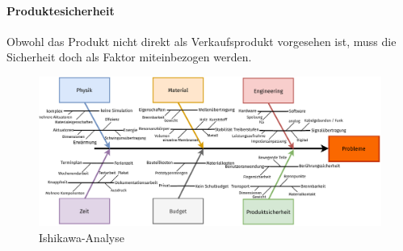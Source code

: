 \paragraph{Produktesicherheit} Obwohl das Produkt nicht direkt als Verkaufsprodukt vorgesehen ist, muss die Sicherheit doch als Faktor miteinbezogen werden.
\vspace{6mm}
\begin{figure}[H]
	\centering
	\includegraphics[width=\textwidth]{pictures/ishikawa.pdf}
	\caption{Ishikawa-Analyse}
	\label{pics:ishikawa}
\end{figure}